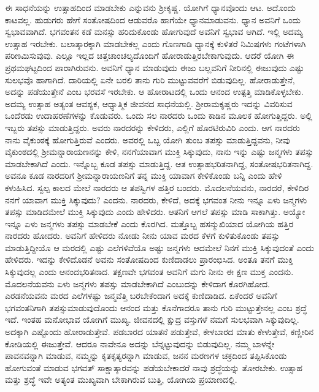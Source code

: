 ಈ ಸಾಧನೆಯನ್ನು ಉತ್ಸಾಹದಿಂದ ಮಾಡಬೇಕು ಎನ್ನುವನು ಶ‍್ರೀಕೃಷ್ಣ. ಯೋಗಿಗೆ ಧ್ಯಾನ\-ವೊಂದು ಆಟ. ಅದೊಂದು ಕಾಟವಲ್ಲ. ಹುಡುಗರು ಹೇಗೆ ಸಂತೋಷದಿಂದ ಆಡುವರೊ ಹಾಗೆಯೇ ಧ್ಯಾನಮಾಡುವನು. ಧ್ಯಾನ ಅವನಿಗೆ ಒಂದು ಸ್ವಭಾವವಾಗಿದೆ. ಭಗವಂತನ ಕಡೆ ಮನಸ್ಸು ಹರಿದುಕೊಂಡು ಹೋಗುವುದೆ ಅವನಿಗೆ ಸ್ವಭಾವ ಆಗಿದೆ. ಇಲ್ಲಿ ಅದಮ್ಯ ಉತ್ಸಾಹ ಇರಬೇಕು. ಬಲಾತ್ಕಾರಕ್ಕಾಗಿ ಮಾಡಬೇಕಲ್ಲ ಎಂದು ಗೊಣಗಾಡಿ ಧ್ಯಾನಕ್ಕೆ ಕುಳಿತರೆ ನಿಮಿಷಗಳು ಗಂಟೆಗಳಾಗಿ ಪರಿಣಮಿಸುವುವು. ಎಲ್ಲೂ ಇಲ್ಲದ ಚಿತ್ತಚಾಂಚಲ್ಯದೊಂದಿಗೆ ಹೋರಾಡುತ್ತಿರ\-ಬೇಕಾಗುವುದು. ಆದರೆ ಯೋಗಿ ಈ ಪ್ರಥಮಘಟ್ಟದಿಂದ ಪಾರಾಗಿರುವನು. ಅವನಿಗೆ ಧ್ಯಾನ ಮಾಡುವುದು ಈಜು ಬಲ್ಲವನಿಗೆ ನೀರಿನಲ್ಲಿ ಈಜುವುದು ಎಷ್ಟು ಸುಲಭವೊ ಹಾಗಾಗಿದೆ. ದಾರಿಯಲ್ಲಿ ಏನೇ ಬರಲಿ ತಾನು ಗುರಿ ಮುಟ್ಟುವವರೆಗೆ ಬಿಡುವುದಿಲ್ಲ. ಹೋರಾಡುತ್ತೇನೆ, ಅದನ್ನು ಪಡೆಯುತ್ತೇನೆ ಎಂಬ ಭರವಸೆ ಇರಬೇಕು. ಆ ಹೋರಾಟದಲ್ಲಿ ಒಂದು ಆನಂದ ಉತ್ಪತ್ತಿ ಮಾಡಿಕೊಳ್ಳಬೇಕು. ಅದಮ್ಯ ಉತ್ಸಾಹ ಅತ್ಯಂತ ಆವಶ್ಯಕ, ಆಧ್ಯಾತ್ಮಿಕ ಜೀವನದ ಸಾಧನೆಯಲ್ಲಿ. ಶ‍್ರೀರಾಮಕೃಷ್ಣರು ಇದನ್ನು ವಿವರಿಸುವ ಒಂದೆರಡು ಉದಾಹರಣೆಗಳನ್ನು ಕೊಡುವರು. ಒಂದು ಸಲ ನಾರದರು ಒಂದು ಕಾಡಿನ ಮೂಲಕ ಹೋಗುತ್ತಿದ್ದರು. ಅಲ್ಲಿ ಇಬ್ಬರು ತಪಸ್ಸು ಮಾಡುತ್ತಿದ್ದರು. ಅವರು ನಾರದರನ್ನು ಕೇಳಿದರು, ಎಲ್ಲಿಗೆ ಹೊರಟಿರುವಿರಿ ಎಂದು. ಆಗ ನಾರದರು ನಾನು ವೈಕುಂಠಕ್ಕೆ ಹೋಗುತ್ತಿರುವೆ ಎಂದರು. ಅವರಲ್ಲಿ ಒಬ್ಬ ಯೋಗಿ ತುಂಬ ತಪಸ್ಸು ಮಾಡುತ್ತಿದ್ದವನು, ನೀವು ವೈಕುಂಠದಲ್ಲಿ ಶ‍್ರೀಮನ್ನಾರಾಯಣನನ್ನು ಕೇಳಿ, ನನಗೆ\break ಯಾವಾಗ ಮುಕ್ತಿ ಸಿಕ್ಕುವುದು, ನಾನು ಇನ್ನು ಎಷ್ಟು ಜನ್ಮಗಳು ತಪಸ್ಸು ಮಾಡಬೇಕಾಗಿದೆ ಎಂದು. ಇನ್ನೊಬ್ಬ ಕೂಡ ತಪಸ್ಸು ಮಾಡುತ್ತಿದ್ದ. ಆತ ಉತ್ಸಾಹಭರಿತನಾಗಿದ್ದ, ಸಂತೋಷಭರಿತನಾಗಿದ್ದ. ಅವನೂ ಕೂಡ ನಾರದರಿಗೆ ಶ‍್ರೀಮನ್ನಾರಾಯಣನಿಗೆ ತನ್ನ ಮುಕ್ತಿ ಯಾವಾಗ ಕೇಳಿಕೊಂಡು ಬನ್ನಿ ಎಂದು ಹೇಳಿ ಕಳುಹಿಸಿದ. ಸ್ವಲ್ಪ ಕಾಲದ ಮೇಲೆ ನಾರದರು ಆ ತಪಸ್ವಿಗಳ ಹತ್ತಿರ ಬಂದರು. ಮೊದಲನೆಯವನು, ನಾರದರೆ, ಕೇಳಿದಿರ ನನಗೆ ಯಾವಾಗ ಮುಕ್ತಿ ಸಿಕ್ಕುವುದು? ಎಂದನು. ನಾರದರು, ಕೇಳಿದೆ, ಅದಕ್ಕೆ ಭಗವಂತ ನೀನು ಇನ್ನೂ ಏಳು ಜನ್ಮಗಳು ತಪಸ್ಸು ಮಾಡಿದಮೇಲೆ ಮುಕ್ತಿ ಸಿಕ್ಕುವುದು ಎಂದು ಹೇಳಿದರು. ಆತನಿಗೆ ಆಗಲೆ ತಪಸ್ಸು ಮಾಡಿ ಸಾಕಾಗಿತ್ತು. ಅಯ್ಯೋ ಇನ್ನೂ ಏಳು ಜನ್ಮಗಳು ತಪಸ್ಸು ಮಾಡಬೇಕೆ ಎಂದು ಕೊರಗಿದ. ಮತ್ತೊಬ್ಬ ಹಸನ್ಮುಖಿಯಾದ ಯೋಗಿಯ ಹತ್ತಿರ ನಾರದರು ಹೋದರು. ಅವನಿಗೆ ಹೇಳಿದರು ನೋಡು ನೀನು ಯಾವ ಮರದ ಕೆಳಗೆ ಕುಳಿತುಕೊಂಡು ತಪಸ್ಸು ಮಾಡುತ್ತಿದ್ದೀಯೊ ಆ ಮರದಲ್ಲಿ ಎಷ್ಟು ಎಲೆಗಳಿವೆಯೊ ಅಷ್ಟು ಜನ್ಮಗಳು ಆದಮೇಲೆ ನಿನಗೆ ಮುಕ್ತಿ ಸಿಕ್ಕುವುದಂತೆ ಎಂದು ಹೇಳಿದರು. ಇದನ್ನು ಕೇಳಿದೊಡನೆ ಅವನು ಸಂತೋಷದಿಂದ ಕುಣಿದಾಡಲು ಪ್ರಾರಂಭಿಸಿದ. ಅಂತೂ ತನಗೆ ಮುಕ್ತಿ ಸಿಕ್ಕುವುದಲ್ಲ ಎಂದು ಆನಂದಭರಿತನಾದ. ತಕ್ಷಣವೇ ಭಗವಂತ ಅವನಿಗೆ ಮಗು ನೀನು ಈ ಕ್ಷಣ ಮುಕ್ತ ಎಂದನು. ಮೊದಲನೆಯವನು ಏಳು ಜನ್ಮಗಳು ತಪಸ್ಸು ಮಾಡಬೇಕಾಗಿದೆ ಎಂಬುದನ್ನು ಕೇಳಿದಾಗ ಕೊರಗಿಹೋದ. ಎರಡನೆಯವನು ಮರದ ಎಲೆಗಳಷ್ಟು ಜನ್ಮವೆತ್ತಿ ಬರಬೇಕೆಂದಾಗ ಅದಕ್ಕೆ ಕುಣಿದಾಡಿದ. ಏಕೆಂದರೆ ಅವನಿಗೆ ಭಗವಂತನಿಗಾಗಿ ತಪಸ್ಸುಮಾಡುವುದೊಂದು ಆನಂದ ಮತ್ತು ಕೊನೆಗಾದರೂ ತಾನು ಗುರಿ ಮುಟ್ಟುತ್ತೇನಲ್ಲ ಎಂಬ ಶ್ರದ್ಧೆ ಇದೆ. ಇಂತಹ ಮನೋಭಾವ ಯೋಗಿಗೆ ಮುಖ್ಯ. ಜೀವನದಲ್ಲಿ ಕ್ಷುದ್ರ ವಸ್ತುಗಳೆ ನಮಗೆ ಸುಲಭವಾಗಿ ಸಿಕ್ಕುವುದಿಲ್ಲ. ಅದಕ್ಕಾಗಿ ಎಷ್ಟೊಂದು ಹೋರಾಡುತ್ತೇವೆ. ಪಡಬಾರದ ಯಾತನೆ ಪಡುತ್ತೇವೆ, ಕೇಳಬಾರದ ಮಾತು ಕೇಳುತ್ತೇವೆ, ಕಣ್ಣೀರಿನ ಕೋಡಿಯಲ್ಲಿ ಈಜುತ್ತೇವೆ. ಆದರೂ ನಾವೇನೂ ಅದನ್ನು ಬೆನ್ನಟ್ಟುವುದನ್ನು ಬಿಡುವುದಿಲ್ಲ. ನಮ್ಮ ಬಾಳನ್ನೇ ಪಾವನವನ್ನಾಗಿ ಮಾಡುವ, ನಮ್ಮನ್ನು ಕೃತಕೃತ್ಯರನ್ನಾಗಿ ಮಾಡುವ, ಜನನ ಮರಣಗಳ ಚಕ್ರದಿಂದ ತಪ್ಪಿಸಿಕೊಂಡು ಹೋಗುವಂತೆ ಮಾಡುವ ಭಗವತ್ ಸಾಕ್ಷಾತ್ಕಾರವನ್ನು ಪಡೆಯಬೇಕಾದರೆ ನಾವು ಶ್ರದ್ಧೆಯನ್ನು ತೋರಬೇಕು. ಉತ್ಸಾಹ ಮತ್ತು ಶ್ರದ್ಧೆ ಇವೇ ಅತ್ಯಂತ ಮುಖ್ಯವಾಗಿ ಬೇಕಾಗಿರುವ ಬುತ್ತಿ, ಯೋಗಿಯ ಪ್ರಯಾಣದಲ್ಲಿ.

